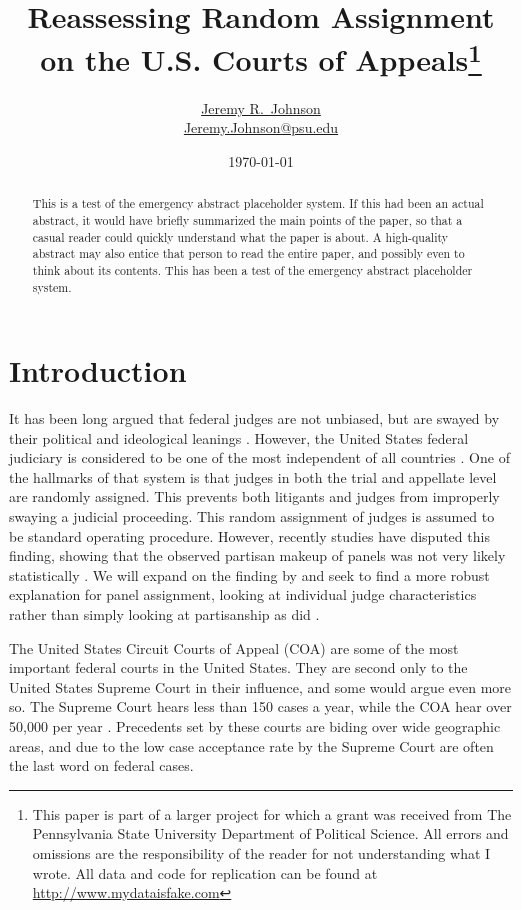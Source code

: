 \documentclass[12pt]{article}
\title{Reassessing Random Assignment on the U.S. Courts of Appeals\footnote{This paper is part of a larger project for which a grant was received from The Pennsylvania State University Department of Political Science.  All errors and omissions are the responsibility of the reader for not understanding what I wrote.  All data and code for replication can be found at \url{http://www.mydataisfake.com} } }
\author{\href{http://www.jeremyrjohnson.org/}{Jeremy R.\ Johnson}\\ \href{mailto:Jeremy.Johnson@psu.edu}{Jeremy.Johnson@psu.edu}}
\affil{Pennsylvania State University}
\date{\today}
\begin{document}
\clearpage\maketitle\thispagestyle{empty}


\begin{abstract}
	\medskip
	This is a test of the emergency abstract placeholder system.  If this had been an actual abstract, it would have briefly summarized the main points of the paper, so that a casual reader could quickly understand what the paper is about.  A high-quality abstract may also entice that person to read the entire paper, and possibly even to think about its contents.  This has been a test of the emergency abstract placeholder system. \\
\end{abstract}

\clearpage
\setcounter{page}{1}
\setcounter{footnote}{0}
\renewcommand*{\thefootnote}{\arabic{footnote}}
\addtolength{\footnotesep}{6pt}


\section{Introduction}
It has been long argued that federal judges are not unbiased, but are swayed by their political and ideological leanings \citep{segal2002supreme}.  However, the United States federal judiciary is considered to be one of the most independent of all countries \citep{Linzer2014}.  One of the hallmarks of that system is that judges in both the trial and appellate level are randomly assigned.  This prevents both litigants and judges from improperly swaying a judicial proceeding.  This random assignment of judges is assumed to be standard operating procedure.  However, recently studies have disputed this finding, showing that the observed partisan makeup of panels was not very likely statistically \citep{Chilton2014}.  We will expand on the finding by \citeauthor{Chilton2014} and seek to find a more robust explanation for panel assignment, looking at individual judge characteristics rather than simply looking at partisanship as did \citet{Chilton2014}.

The United States Circuit Courts of Appeal (COA) are some of the most important federal courts in the United States.  They are second only to the United States Supreme Court in their influence, and some would argue even more so.  The Supreme Court hears less than 150 cases a year, while the COA hear over 50,000 per year \citep{Caseloadstats}.  Precedents set by these courts are biding over wide geographic areas, and due to the low case acceptance rate by the Supreme Court are often the last word on federal cases.
\end{document}
